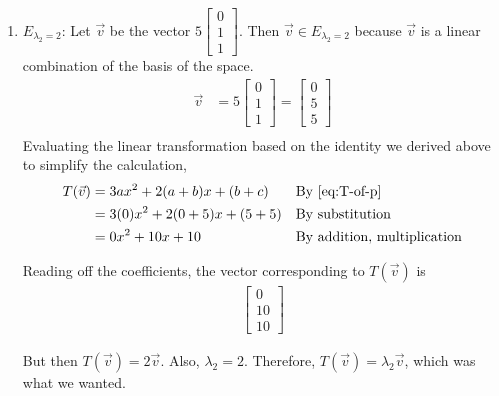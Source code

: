 \documentclass[10pt,letterpaper,final]{report}
\newcommand{\reason}[1]{&& \text{#1}}
\begin{document}
\begin{enumerate}[label=(\alph*)]
\begin{enumerate}
          \item $E_{\lambda_2 = 2}$: Let $\vec{v}$ be the vector $5\begin{bmatrix}0\\1\\1\end{bmatrix}$. Then $\vec{v} \in E_{\lambda_2 = 2}$ because $\vec{v}$ is a linear combination of the basis of the space.
                \begin{align*}
                  \vec{v} & = 5\begin{bmatrix}0\\1\\1\end{bmatrix} = \begin{bmatrix}
                                                                       0 \\5\\5
                                                                     \end{bmatrix} \\[1ex]
                \end{align*}
                Evaluating the linear transformation based on the identity we derived above to simplify the calculation,
                \begin{align*}
                  T(\vec{v}) & = 3ax^2 + 2(a+b)x + (b + c) \reason{By \eqref{eq:T-of-p}} \\
                             & = 3(0)x^2 + 2(0+5)x + (5 + 5) \reason{By substitution}    \\
                             & = 0x^2 + 10x + 10 \reason{By addition, multiplication}
                \end{align*}

                Reading off the coefficients, the vector corresponding to $T(\vec{v})$ is
                \begin{align*}
                  \begin{bmatrix}
                    0 \\10\\10
                  \end{bmatrix}
                \end{align*}

                But then $T(\vec{v}) = 2\vec{v}$. Also, $\lambda_2 = 2$. Therefore, $T(\vec{v}) = \lambda_2\vec{v}$, which was what we wanted.


\end{enumerate}
\end{enumerate}
\end{document}
